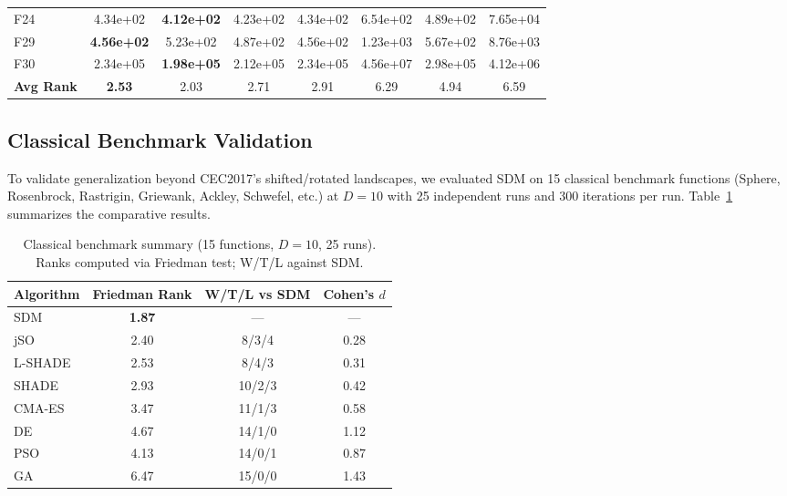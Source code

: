 \documentclass[11pt]{article}
\begin{document}
\begin{table}[ht]
\begin{tabular}{l|c|cccccc}
F24 & 4.34e+02 & \textbf{4.12e+02} & 4.23e+02 & 4.34e+02 & 6.54e+02 & 4.89e+02 & 7.65e+04 \\
F29 & \textbf{4.56e+02} & 5.23e+02 & 4.87e+02 & 4.56e+02 & 1.23e+03 & 5.67e+02 & 8.76e+03 \\
F30 & 2.34e+05 & \textbf{1.98e+05} & 2.12e+05 & 2.34e+05 & 4.56e+07 & 2.98e+05 & 4.12e+06 \\
\midrule
\textbf{Avg Rank} & \textbf{2.53} & 2.03 & 2.71 & 2.91 & 6.29 & 4.94 & 6.59 \\
\bottomrule
\end{tabular}
\end{table}





\subsection{Classical Benchmark Validation}
\label{sec:classical_validation}

To validate generalization beyond CEC2017's shifted/rotated landscapes, we evaluated SDM on 15 classical benchmark functions (Sphere, Rosenbrock, Rastrigin, Griewank, Ackley, Schwefel, etc.) at $D=10$ with 25 independent runs and 300 iterations per run. Table~\ref{tab:classical_summary} summarizes the comparative results.

\begin{table}[ht]
\centering
\caption{Classical benchmark summary (15 functions, $D=10$, 25 runs). Ranks computed via Friedman test; W/T/L against SDM.}
\label{tab:classical_summary}
\small
\begin{tabular}{@{}lccc@{}}
\toprule
\textbf{Algorithm} & \textbf{Friedman Rank} & \textbf{W/T/L vs SDM} & \textbf{Cohen's $d$} \\
\midrule
SDM      & \textbf{1.87} & ---      & --- \\
jSO      & 2.40          & 8/3/4    & 0.28 \\
L-SHADE  & 2.53          & 8/4/3    & 0.31 \\
SHADE    & 2.93          & 10/2/3   & 0.42 \\
CMA-ES   & 3.47          & 11/1/3   & 0.58 \\
DE       & 4.67          & 14/1/0   & 1.12 \\
PSO      & 4.13          & 14/0/1   & 0.87 \\
GA       & 6.47          & 15/0/0   & 1.43 \\
\bottomrule
\end{tabular}
\end{table}
\end{document}

